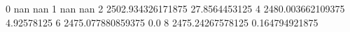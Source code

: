 0 nan nan
1 nan nan
2 2502.934326171875 27.8564453125
4 2480.003662109375 4.92578125
6 2475.077880859375 0.0
8 2475.24267578125 0.164794921875
